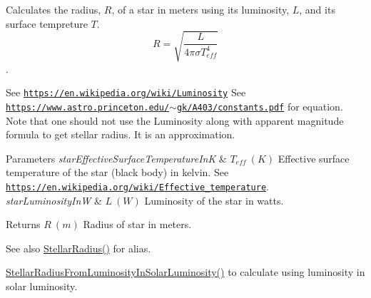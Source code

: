 Calculates the radius, $R$, of a star in meters using its luminosity, $L$, and its surface tempreture $T$. \[R=\sqrt{\dfrac{L}{4\pi \sigma T_{eff}^4}}\]. 

See \href{https://en.wikipedia.org/wiki/Luminosity}{\tt https\+://en.\+wikipedia.\+org/wiki/\+Luminosity} See \href{https://www.astro.princeton.edu/~gk/A403/constants.pdf}{\tt https\+://www.\+astro.\+princeton.\+edu/$\sim$gk/\+A403/constants.\+pdf} for equation. Note that one should not use the Luminosity along with apparent magnitude formula to get stellar radius. It is an approximation.


\begin{DoxyParams}{Parameters}
{\em star\+Effective\+Surface\+Temperature\+InK} & $T_{eff}\ (K)$ Effective surface temperature of the star (black body) in kelvin. See \href{https://en.wikipedia.org/wiki/Effective_temperature}{\tt https\+://en.\+wikipedia.\+org/wiki/\+Effective\+\_\+temperature}. \\
\hline
{\em star\+Luminosity\+InW} & $L\ (W)$ Luminosity of the star in watts. \\
\hline
\end{DoxyParams}
\begin{DoxyReturn}{Returns}
$R\ (m)$ Radius of star in meters. 
\end{DoxyReturn}
\begin{DoxySeeAlso}{See also}
\mbox{\hyperlink{group___e_g_x_phys-_stellar_radius_ga612cd22c37341a1864cd2fc5c858e18e}{Stellar\+Radius()}} for alias. 

\mbox{\hyperlink{group___e_g_x_phys-_stellar_radius_ga49f0848777ba12cdfc78d112d82036ce}{Stellar\+Radius\+From\+Luminosity\+In\+Solar\+Luminosity()}} to calculate using luminosity in solar luminosity. 
\end{DoxySeeAlso}
